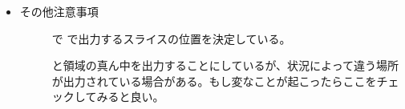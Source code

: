 \documentclass[letterpaper,10pt,dvipdfmx,report]{sphinxmanual}
\begin{document}
\begin{itemize}
\begin{description}
\begin{sphinxVerbatim}[commandchars=\\\{\}]
  
  
\end{sphinxVerbatim}

\end{description}

\item {} \begin{description}
\item[{その他注意事項}] \leavevmode
{} で  で出力するスライスの位置を決定している。

と領域の真ん中を出力することにしているが、状況によって違う場所が出力されている場合がある。もし変なことが起こったらここをチェックしてみると良い。

\end{description}

\end{itemize}
\end{document}
